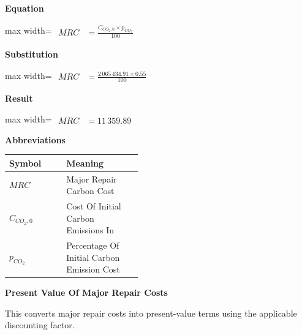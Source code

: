 \documentclass{article}
\begin{document}
\vspace{0.4em}
\textbf{Equation}\par\vspace{-0.35em}
\begin{center}
\begin{adjustbox}{max width=\linewidth}
$\displaystyle\begin{aligned}
MRC &= \frac{C_{CO_2,0} \times p_{CO_2}}{100}
\end{aligned}$
\end{adjustbox}
\end{center}
\vspace{0.4em}
\textbf{Substitution}\par\vspace{-0.35em}
\begin{center}
\begin{adjustbox}{max width=\linewidth}
$\displaystyle\begin{aligned}
MRC &= \frac{2\,065\,434.91 \times 0.55}{100}
\end{aligned}$
\end{adjustbox}
\end{center}
\vspace{0.4em}
\textbf{Result}\par\vspace{-0.35em}
\begin{center}
\begin{adjustbox}{max width=\linewidth}
$\displaystyle\begin{aligned}
MRC &= 11\,359.89
\end{aligned}$
\end{adjustbox}
\end{center}
\vspace{0.4em}
\textbf{Abbreviations}\par\vspace{-0.35em}
\begin{tabularx}{\linewidth}{>{\raggedright\arraybackslash}p{0.43\linewidth} >{\raggedright\arraybackslash}X}
\toprule
Symbol & Meaning \\
\midrule
$MRC$ & Major Repair Carbon Cost \\
$C_{CO_2,0}$ & Cost Of Initial Carbon Emissions In \\
$p_{CO_2}$ & Percentage Of Initial Carbon Emission Cost \\
\bottomrule
\end{tabularx}
\vspace{0.6em}
\vspace{0.4em}
\textbf{Present Value Of Major Repair Costs}\par\vspace{-0.35em}
This converts major repair costs into present-value terms using the applicable discounting factor.
\end{document}
